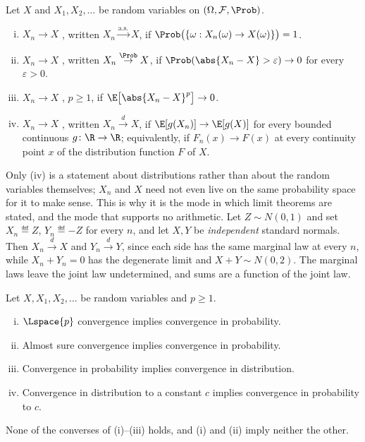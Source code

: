 \begin{definition}\label{def:modes-convergence}
	Let $X$ and $X_1,X_2,\dots$ be random variables on $(\Omega,\mathcal{F},\Prob)$.
	\begin{enumerate}[(i)]
		\item $X_n\to X$ , written
		      $X_n\overset{\text{a.s.}}{\to}X$, if
		      $\Prob\bigl(\{\omega : X_n(\omega)\to X(\omega)\}\bigr)=1$.
		\item $X_n\to X$ , written
		      $X_n\overset{\Prob}{\to}X$, if $\Prob(\abs{X_n-X}>\varepsilon)\to0$ for
		      every $\varepsilon>0$.
		\item $X_n\to X$ , $p\geq1$, if $\E\bigl[\abs{X_n-X}^{p}\bigr]\to0$.
		\item $X_n\to X$ ,
		      written $X_n\overset{d}{\to}X$, if $\E[g(X_n)]\to\E[g(X)]$ for every
		      bounded continuous $g\colon\R\to\R$; equivalently, if
		      $F_n(x)\to F(x)$ at every continuity point $x$ of the distribution
		      function $F$ of $X$.
	\end{enumerate}
\end{definition}

Only (iv) is a statement about distributions rather than about the random
variables themselves; $X_n$ and $X$ need not even live on the same probability
space for it to make sense. This is why it is the mode in which limit theorems
are stated, and the mode that supports no arithmetic. Let $Z\sim N(0,1)$ and set
$X_n\eqdef Z$, $Y_n\eqdef-Z$ for every $n$, and let $X,Y$ be \emph{independent}
standard normals. Then $X_n\overset{d}{\to}X$ and $Y_n\overset{d}{\to}Y$, since
each side has the same marginal law at every $n$, while $X_n+Y_n=0$ has the
degenerate limit and $X+Y\sim N(0,2)$. The marginal laws leave the joint law
undetermined, and sums are a function of the joint law.

\begin{proposition}\label{prop:convergence-hierarchy}
	Let $X,X_1,X_2,\dots$ be random variables and $p\geq1$.
	\begin{enumerate}[(i)]
		\item $\Lspace{p}$ convergence implies convergence in probability.
		\item Almost sure convergence implies convergence in probability.
		\item Convergence in probability implies convergence in distribution.
		\item Convergence in distribution to a constant $c$ implies convergence in
		      probability to $c$.
	\end{enumerate}
	None of the converses of (i)--(iii) holds, and (i) and (ii) imply neither
	the other.
\end{proposition}

